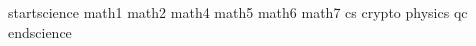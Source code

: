  {startscience}
 {math1}
 {math2}
 {math4}
 {math5}
 {math6}
 {math7}
 {cs}
 {crypto}
 {physics}
 {qc}
 {endscience}

